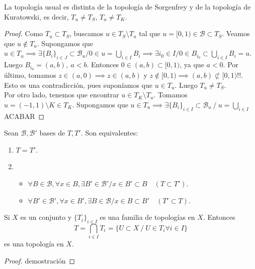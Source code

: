 \begin{properties}
  La topología usual es distinta de la topología de Sorgenfrey y de la topología de Kuratowski, es decir, $T_u \neq T_S$, $T_u \neq T_K$.
\end{properties}
\begin{proof}
  Como $T_u \subset T_S$, buscamos $u \in T_S \setminus T_u$ tal que $u = [0,1) \in \mathcal{B} \subset T_S$. Veamos que $u \not\in T_u$. Supongamos que $u \in T_u \implies \exists \{B_i\}_{i \in J} \subset \mathcal{B}_u / 0 \in u = \bigcup_{i \in I}B_i \implies \exists i_0 \in I / 0 \in B_{i_0} \subset  \bigcup_{i \in I} B_i = u$. Luego $B_{i_0} = (a,b),\ a<b$. Entonces $0 \in (a,b) \subset [0,1)$, ya que $a<0$. Por último, tomamos $z \in (a,0) \implies z \in (a,b)$ y $z \not\in [0,1) \implies (a,b) \not\subset [0,1)!!$. Esto es una contradicción, pues suponíamos que $u \in T_u$. Luego $T_u \neq T_S$. \\
  Por otro lado, tenemos que encontrar $u \in T_K \setminus T_u$. Tomamos $u = (-1,1) \setminus K \in T_K$. Supongamos que $u \in T_u \implies \exists \{B_i\}_{i \in I} \subset \mathcal{B}_u\ /\ u = \bigcup_{i \in I}$ ACABAR
\end{proof}
\begin{ncor}
  Sean $\mathcal{B}, \mathcal{B}'$ bases de $T,T'$. Son equivalentes:
  \begin{enumerate}
    \item $T=T'$.
    \item \begin{itemize}
            \item $\forall B \in \mathcal{B}, \forall x \in B, \exists B' \in \mathcal{B}' / x \in B' \subset B \quad (T \subset T')$.
            \item $\forall B' \in \mathcal{B}', \forall x \in B', \exists B \in \mathcal{B} / x \in B \subset B' \quad (T' \subset T)$.
          \end{itemize}
  \end{enumerate}
\end{ncor}

\begin{lema}
  Si $X$ es un conjunto y $\{T_i\}_{i \in I}$ es una familia de topologías en $X$. Entonces \[T=\bigcap_{i \in I} T_i = \{U \subset X\ /\ U \in T_i \forall i \in I\} \] es una topología en $X$.
\end{lema}
\begin{proof}
  demostración
\end{proof}

